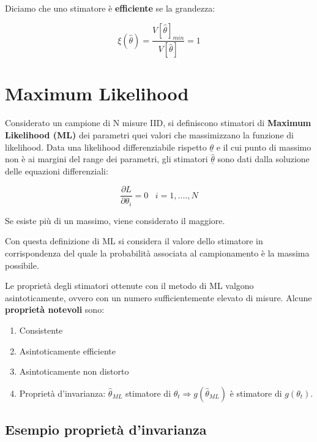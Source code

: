 \noindent Diciamo che uno stimatore \`{e} \textbf{efficiente} se la grandezza:

\begin{equation}
	\xi(\hat{\theta}) = \frac{V[\hat{\theta}]_{min}}{V[\hat{\theta}]} = 1
\end{equation}
	
\section{Maximum Likelihood}

Considerato un campione di N misure IID, si definiscono stimatori di \textbf{Maximum Likelihood (ML)} dei parametri quei valori che massimizzano la funzione di likelihood. Data una likelihood differenziabile rispetto $\underline{\theta}$ e il cui punto di massimo non \`{e} ai margini del range dei parametri, gli stimatori $\underline{\hat{\theta}}$ sono dati dalla soluzione delle equazioni differenziali:

\begin{equation}
\frac{\partial L}{\partial \theta_{i}}=0 \;\;\; i = 1,....,N
\end{equation}

\noindent Se esiste pi\`{u} di un massimo, viene considerato il maggiore. \newline

\noindent Con questa definizione di ML si considera il valore dello stimatore in corrispondenza del quale la probabilit\`{a} associata al campionamento \`{e} la massima possibile.

\noindent Le propriet\`{a} degli stimatori ottenute con il metodo di ML valgono asintoticamente, ovvero con un numero sufficientemente elevato di misure. Alcune \textbf{propriet\`{a} notevoli} sono:

\begin{enumerate}
	\item Consistente
	\item Asintoticamente efficiente
	\item Asintoticamente non distorto
	\item Propriet\`{a} d'invarianza: $\hat{\theta}_{ML}$ stimatore di $\theta_{t} \Rightarrow g(\hat{\theta}_{ML})$ \`{e} stimatore di $g(\theta_{t})$.
\end{enumerate}

\subsection*{Esempio propriet\`{a} d'invarianza}

